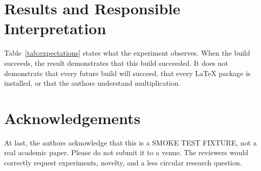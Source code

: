\section{Results and Responsible Interpretation}

Table~\ref{tab:expectations} states what the experiment observes. When the
build succeeds, the result demonstrates that this build succeeded. It does not
demonstrate that every future build will succeed, that every LaTeX package is
installed, or that the authors understand multiplication.

\section*{Acknowledgements}

At last, the authors acknowledge that this is a SMOKE TEST FIXTURE, not a real
academic paper. Please do not submit it to a venue. The reviewers would
correctly request experiments, novelty, and a less circular research question.
